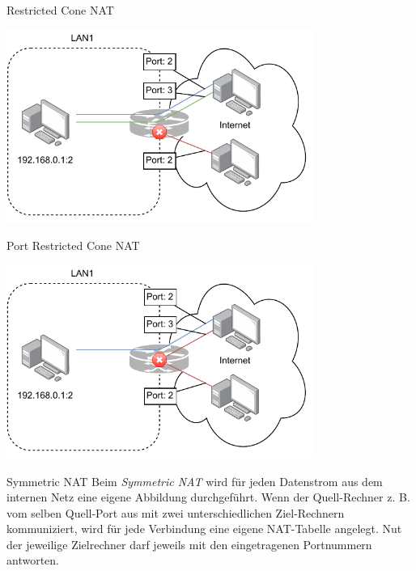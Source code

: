 \begin{bonus}{Restricted Cone NAT}
    \begin{center}
        \includegraphics[width=0.75\textwidth]{includes/figures/bonus_restricted_cone_nat.pdf}
    \end{center}
\end{bonus}

\begin{bonus}{Port Restricted Cone NAT}
    \begin{center}
        \includegraphics[width=0.75\textwidth]{includes/figures/bonus_port_restricted_cone_nat.pdf}
    \end{center}
\end{bonus}

\begin{bonus}{Symmetric NAT}
    Beim \emph{Symmetric NAT} wird für jeden Datenstrom aus dem internen Netz eine eigene Abbildung durchgeführt.
    Wenn der Quell-Rechner z. B. vom selben Quell-Port aus mit zwei unterschiedlichen Ziel-Rechnern kommuniziert, wird für jede Verbindung eine eigene NAT-Tabelle angelegt.
    Nut der jeweilige Zielrechner darf jeweils mit den eingetragenen Portnummern antworten.
\end{bonus}
